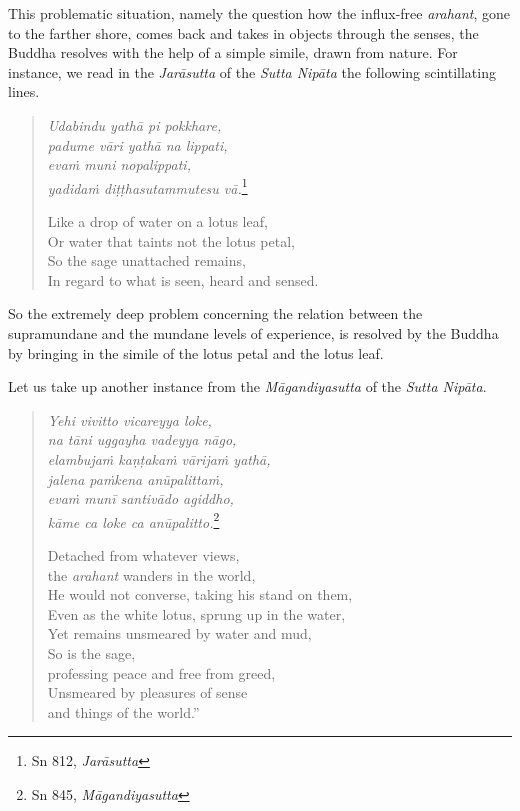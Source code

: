 This problematic situation, namely the question how the influx-free \emph{arahant}, gone to the farther shore, comes back and takes in objects through the senses, the Buddha resolves with the help of a simple simile, drawn from nature. For instance, we read in the \emph{Jarāsutta} of the \emph{Sutta Nipāta} the following scintillating lines.

\begin{quote}
\emph{Udabindu yathā pi pokkhare,}\\
\emph{padume vāri yathā na lippati,}\\
\emph{evaṁ muni nopalippati,}\\
\emph{yadidaṁ diṭṭhasutammutesu vā.}\footnote{Sn 812, \emph{Jarāsutta}}

Like a drop of water on a lotus leaf,\\
Or water that taints not the lotus petal,\\
So the sage unattached remains,\\
In regard to what is seen, heard and sensed.
\end{quote}

So the extremely deep problem concerning the relation between the supramundane and the mundane levels of experience, is resolved by the Buddha by bringing in the simile of the lotus petal and the lotus leaf.

Let us take up another instance from the \emph{Māgandiyasutta} of the \emph{Sutta Nipāta}.

\begin{quote}
\emph{Yehi vivitto vicareyya loke,}\\
\emph{na tāni uggayha vadeyya nāgo,}\\
\emph{elambujaṁ kaṇṭakaṁ vārijaṁ yathā,}\\
\emph{jalena paṁkena anūpalittaṁ,}\\
\emph{evaṁ munī santivādo agiddho,}\\
\emph{kāme ca loke ca anūpalitto.}\footnote{Sn 845, \emph{Māgandiyasutta}}

Detached from whatever views,\\
\vin the \emph{arahant} wanders in the world,\\
He would not converse, taking his stand on them,\\
Even as the white lotus, sprung up in the water,\\
Yet remains unsmeared by water and mud,\\
So is the sage,\\
\vin professing peace and free from greed,\\
Unsmeared by pleasures of sense\\
\vin and things of the world.''
\end{quote}

